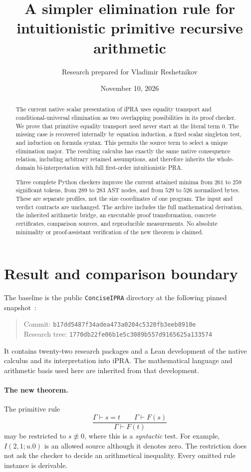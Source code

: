 \documentclass[11pt]{article}
\title{A simpler elimination rule for\\intuitionistic primitive recursive arithmetic}
\author{Research prepared for Vladimir Reshetnikov}
\date{November 10, 2026}
\theoremstyle{definition}\newtheorem{definition}[theorem]{Definition}
\theoremstyle{remark}\newtheorem{remark}[theorem]{Remark}
\newcommand{\file}[1]{\texttt{#1}}
\newcommand{\synneq}{\not\equiv}
\begin{document}
\maketitle
\begin{abstract}
The current native scalar presentation of iPRA uses equality transport and
conditional-universal elimination as two overlapping possibilities in its
proof checker. We prove that primitive equality transport need never start
at the literal term $0$. The missing case is recovered internally by
equation induction, a fixed scalar singleton test, and induction on formula
syntax. This permits the source term to select a unique elimination major.
The resulting calculus has exactly the same native consequence relation,
including arbitrary retained assumptions, and therefore inherits the
whole-domain bi-interpretation with full first-order intuitionistic PRA.

Three complete Python checkers improve the current attained minima from
$261$ to $259$ significant tokens, from $289$ to $283$ AST nodes, and from
$529$ to $526$ normalized bytes. These are separate profiles, not the size
coordinates of one program. The input and verdict contracts are unchanged.
The archive includes the full mathematical derivation, the inherited
arithmetic bridge, an executable proof transformation, concrete certificates,
comparison sources, and reproducible measurements. No absolute minimality or
proof-assistant verification of the new theorem is claimed.
\end{abstract}
\clearpage
\setcounter{tocdepth}{1}
\tableofcontents
\clearpage

\section{Result and comparison boundary}
\label{sec:result}

The baseline is the public \file{ConciseIPRA} directory at the following
pinned snapshot~\cite{snapshot}:
\begin{quote}\small
Commit: \texttt{b17dd5487f34adea473a0204c5320fb3eeb8910e}\\
Research tree: \texttt{1770db22fe06b1e5c3089b557d9165625a133574}
\end{quote}
It contains twenty-two research packages and a Lean development of the native
calculus and its interpretation into iPRA. The mathematical language and
arithmetic basis used here are inherited from that development.

\paragraph{The new theorem.}
The primitive rule
\[
 \frac{\Gamma\vdash s=t\qquad\Gamma\vdash F(s)}
      {\Gamma\vdash F(t)}
\]
may be restricted to $s\synneq0$, where this is a \emph{syntactic} test.
For example, $I(2,1;u.0)$ is an allowed source although it denotes zero.
The restriction does not ask the checker to decide an arithmetical
inequality. Every omitted rule instance is derivable.
\end{document}
